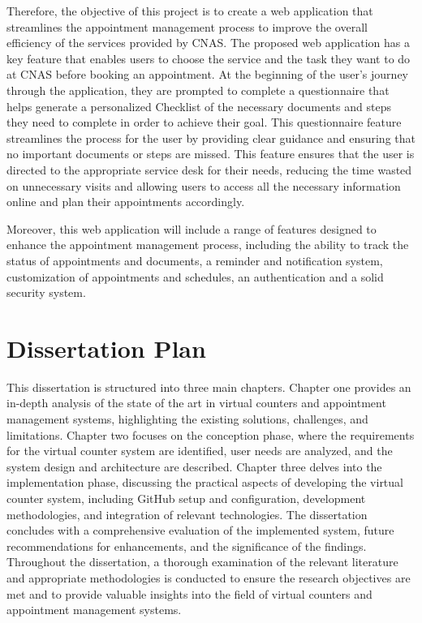 Therefore, the objective of this project is to create a web application that streamlines the appointment management process to improve the overall efficiency of the services provided by CNAS. The proposed web application has a key feature that enables users to choose the service and the task they want to do at CNAS before booking an appointment. At the beginning of the user's journey through the application, they are prompted to complete a questionnaire that helps generate a personalized Checklist of the necessary documents and steps they need to complete in order to achieve their goal. This questionnaire feature streamlines the process for the user by providing clear guidance and ensuring that no important documents or steps are missed. This feature ensures that the user is directed to the appropriate service desk for their needs, reducing the time wasted on unnecessary visits and allowing users to access all the necessary information online and plan their appointments accordingly.

Moreover, this web application will include a range of features designed to enhance the appointment management process, including the ability to track the status of appointments and documents, a reminder and notification system, customization of appointments and schedules, an authentication and a solid security system.

\newpage
{}

\section*{Dissertation Plan}

This dissertation is structured into three main chapters. Chapter one provides an in-depth analysis of the state of the art in virtual counters and appointment management systems, highlighting the existing solutions, challenges, and limitations. Chapter two focuses on the conception phase, where the requirements for the virtual counter system are identified, user needs are analyzed, and the system design and architecture are described. Chapter three delves into the implementation phase, discussing the practical aspects of developing the virtual counter system, including GitHub setup and configuration, development methodologies, and integration of relevant technologies. The dissertation concludes with a comprehensive evaluation of the implemented system, future recommendations for enhancements, and the significance of the findings. Throughout the dissertation, a thorough examination of the relevant literature and appropriate methodologies is conducted to ensure the research objectives are met and to provide valuable insights into the field of virtual counters and appointment management systems.

